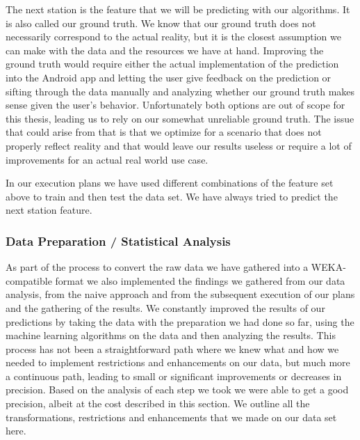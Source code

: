 The next station is the feature that we will be predicting with our algorithms. It is also called our ground truth. We know that our ground truth does not necessarily correspond to the actual reality, but it is the closest assumption we can make with the data and the resources we have at hand. Improving the ground truth would require either the actual implementation of the prediction into the Android app and letting the user give feedback on the prediction or sifting through the data manually and analyzing whether our ground truth makes sense given the user's behavior. Unfortunately both options are out of scope for this thesis, leading us to rely on our somewhat unreliable ground truth. The issue that could arise from that is that we optimize for a scenario that does not properly reflect reality and that would leave our results useless or require a lot of improvements for an actual real world use case.

In our execution plans we have used different combinations of the feature set above to train and then test the data set. We have always tried to predict the next station feature.


\subsubsection{Data Preparation / Statistical Analysis}
\label{subsubsec:data_preparation}
As part of the process to convert the raw data we have gathered into a WEKA-compatible format we also implemented the findings we gathered from our data analysis, from the naive approach and from the subsequent execution of our plans and the gathering of the results. We constantly improved the results of our predictions by taking the data with the preparation we had done so far, using the machine learning algorithms on the data and then analyzing the results. This process has not been a straightforward path where we knew what and how we needed to implement restrictions and enhancements on our data, but much more a continuous path, leading to small or significant improvements or decreases in precision. Based on the analysis of each step we took we were able to get a good precision, albeit at the cost described in this section. We outline all the transformations, restrictions and enhancements that we made on our data set here.

